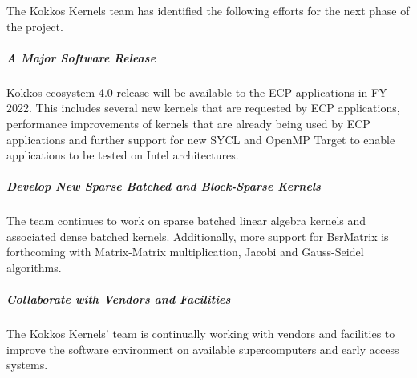 The Kokkos Kernels team has identified the following efforts for the next phase of the project.

	\subparagraph{A Major Software Release} Kokkos ecosystem 4.0 release 
	will be available to the ECP applications in FY 2022. This includes several new 
	kernels that are requested by ECP applications, performance improvements of
	kernels that are already being used by ECP applications and further support for
        new SYCL and OpenMP Target to enable applications to be tested on Intel architectures.
	\subparagraph{Develop New Sparse Batched and Block-Sparse Kernels} The team continues
        to work on sparse batched linear algebra kernels and associated dense batched kernels.
        Additionally, more support for BsrMatrix is forthcoming with Matrix-Matrix multiplication,
        Jacobi and Gauss-Seidel algorithms.
	\subparagraph{Collaborate with Vendors and Facilities} The Kokkos Kernels' team is
        continually working with vendors and facilities to improve the software environment
        on available supercomputers and early access systems.

